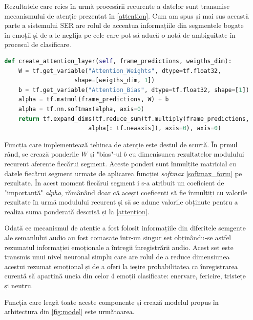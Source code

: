 \documentclass[a4paper,12pt]{book}
\begin{document}
		Rezultatele care reies în urmă procesării recurente a datelor sunt transmise mecanismului de atenție prezentat în \ref{attention}. Cum am spus și mai sus această parte a sistemului SER are rolul de accentua informațiile din segmentele bogate în emoții și de a le neglija pe cele care pot să aducă o notă de ambiguitate în procesul de clasificare. \par
		
		\begin{lstlisting}[language=Python, caption={Metoda care implementeaza mecanismul de atentie, \ref{attention}.}]	
def create_attention_layer(self, frame_predictions, weigths_dim):
	W = tf.get_variable("Attention_Weights", dtype=tf.float32, 
					shape=[weigths_dim, 1])
	b = tf.get_variable("Attention_Bias", dtype=tf.float32, shape=[1])	
	alpha = tf.matmul(frame_predictions, W) + b
	alpha = tf.nn.softmax(alpha, axis=0)
	return tf.expand_dims(tf.reduce_sum(tf.multiply(frame_predictions, 
						alpha[: tf.newaxis]), axis=0), axis=0)		\end{lstlisting}		
		Funcția care implementează tehinca de atenție este destul de scurtă. În prmul rând, se crează ponderile $W$ și "bias"-ul $b$ cu dimenisunea rezultatelor modulului recurent aferente fiecărui segment. Aceste ponderi sunt înmulțite matricial cu datele fiecărui segment urmate de aplicarea funcției \textit{softmax} \ref{softmax_form} pe rezultate. În acest moment fiecărui segment i s-a atribuit un coeficient de "importanță" \textit{alpha}, rămânând doar că acești coeficenti să fie înmulțiți cu valorile rezultate în urmă modulului recurent și să se adune valorile obținute pentru a realiza suma ponderată descrisă și la  \ref{attention}. \par
		
		Odată ce mecanismul de atenție a fost folosit informațiile din diferitele semgente ale semanlului audio au fost comasate într-un singur set obținându-se astfel rezumatul informației emoționale a întregii înregistrării audio. Acest set este transmis unui nivel neuronal simplu care are rolul de a reduce dimensiunea acestui rezumat emoțional și de a oferi la ieșire probabilitatea ca înregistrarea curentă să aparțină uneia din celor 4 emoții clasificate: enervare, fericire, tristețe și neutru. \par
		
		Funcția care leagă toate aceste componente și crează modelul propus în arhitectura din \ref{fig:model} este următoarea.
		
\end{document}
